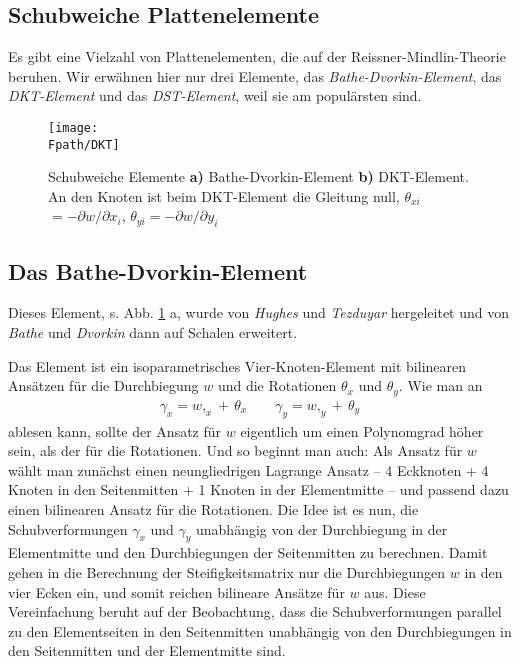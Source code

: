 {\textcolor{sectionTitleBlue}{\section{Schubweiche Plattenelemente}}}\label{Schubweiche Plattenelemente}
Es gibt eine Vielzahl von Plattenelementen, die auf der Reissner-Mindlin-Theorie beruhen. Wir erw\"{a}hnen hier nur drei Elemente, das {\em Bathe-Dvorkin-Element\/}, das {\em DKT-Element\/} und das {\em DST-Element\/}, weil sie am popul\"{a}rsten sind.
\begin{figure}[tbp]
\centering
\if {} \sidecaption \fi
\texttt{[image: \\Fpath/DKT]}
\caption{Schubweiche Elemente {\bf a)} Bathe-Dvorkin-Element {\bf b)} DKT-Element. An
den Knoten ist beim DKT-Element die Gleitung null, $\theta_{xi}$ $= - \partial w/\partial
x_i$, $\theta_{yi} = - \partial w/\partial y_i$} \label{DKT}
\end{figure}%

{\textcolor{sectionTitleBlue}{\subsection{Das Bathe-Dvorkin-Element}}}
Dieses Element, s. Abb. \ref{DKT} a, wurde von {\em Hughes\/} und {\em Tezduyar\/} \cite{Hughes2} her\-geleitet und von
{\em Bathe\/} und {\em Dvorkin\/} \cite{Bathe2} dann auf Schalen erweitert.

Das Element ist ein isoparametrisches Vier-Knoten-Element mit bilinearen Ans\"{a}tzen f\"{u}r die Durchbiegung $w$ und die Rotationen $\theta_x$ und $\theta_y$. Wie man an
\begin{align}
\gamma_x = w,_x + \, \theta_x \qquad \gamma_y = w,_y + \, \theta_y
\end{align}
ablesen kann, sollte der Ansatz f\"{u}r $w$ eigentlich um einen Polynomgrad h\"{o}her sein, als der f\"{u}r die Rotationen. Und so beginnt man auch: Als Ansatz f\"{u}r $w$ w\"{a}hlt man zun\"{a}chst einen neungliedrigen Lagrange Ansatz -- 4 Eckknoten + 4 Knoten in den Seitenmitten + 1 Knoten in der Elementmitte -- und passend dazu einen bilinearen Ansatz f\"{u}r die Rotationen. Die Idee ist es nun, die Schubverformungen $\gamma_x$ und $\gamma_y$ unabh\"{a}ngig von der Durchbiegung in der Elementmitte und den Durchbiegungen der Seitenmitten zu berechnen. Damit gehen in die Berechnung der Steifigkeitsmatrix nur die Durchbiegungen $w$ in den vier Ecken ein, und somit reichen bilineare Ans\"{a}tze f\"{u}r $w$ aus. Diese Vereinfachung beruht auf der Beobachtung, dass die Schubverformungen parallel zu den Elementseiten in den Seitenmitten unabh\"{a}ngig von den Durchbiegungen in den Seitenmitten und der Elementmitte sind.

